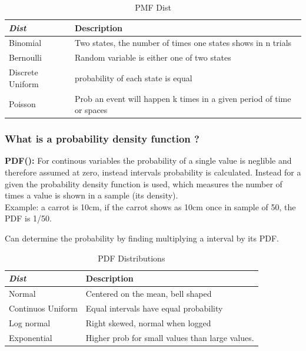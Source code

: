 \documentclass[11pt]{scrartcl} %
\begin{document}
\begin{table}[h] %
	\centering %
	\begin{tabular}{l l}
		\toprule
		\textit{Dist} & \textbf{Description} \\
		\midrule
		Binomial & Two states, the number of times one states shows in n trials \\
		Bernoulli & Random variable is either one of two states \\
		Discrete Uniform & probability of each state is equal \\
		Poisson & Prob an event will happen k times in a given period of time or spaces \\
		\bottomrule
	\end{tabular}
	\caption{PMF Dist}
\end{table}

\subsubsection{What is a probability density function ?}

\textbf{PDF():} For continous variables the probability of a single value is neglible and therefore
assumed at zero, instead intervals probability is calculated. Instead for a given the probability density function is used,
which measures the number of times a value is shown in a sample (its density).\\

Example: a carrot is 10cm, if the carrot shows as 10cm once in sample of 50, the PDF is 1/50.

Can determine the probability by finding multiplying a interval by its PDF.

\begin{table}[h] %
	\centering %
	\begin{tabular}{l l}
		\toprule
		\textit{Dist} & \textbf{Description} \\
		\midrule
		Normal & Centered on the mean, bell shaped\\
		Continuos Uniform & Equal intervals have equal probability \\
		Log normal & Right skewed, normal when logged \\
		Exponential & Higher prob for small values than large values.\\
		\bottomrule
	\end{tabular}
	\caption{PDF Distributions}
\end{table}
\end{document}

